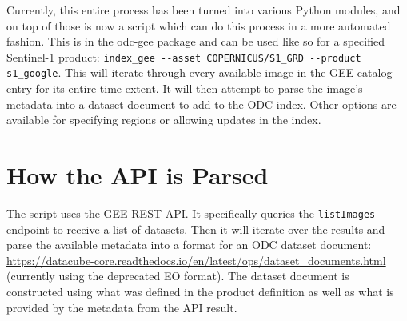 \documentclass{article}
\begin{document}
Currently, this entire process has been turned into various Python modules, and
on top of those is now a script which can do this process in a more automated
fashion. This is in the odc-gee package and can be used like so for a specified
Sentinel-1 product:
\lstinline{index_gee --asset COPERNICUS/S1_GRD --product s1_google}. This will
iterate through every available image in the GEE catalog entry for its entire
time extent. It will then attempt to parse the image's metadata into a dataset
document to add to the ODC index. Other options are available for specifying
regions or allowing updates in the index.

\section{How the API is Parsed}
The script uses the
\href{https://developers.google.com/earth-engine/reference}{GEE REST API}. It
specifically queries the
\href{https://developers.google.com/earth-engine/reference/rest/v1alpha/projects.assets/listImages}{\lstinline{listImages}
endpoint} to receive a list of datasets. Then it will iterate over the results
and parse the available metadata into a format for an ODC dataset document:
\url{https://datacube-core.readthedocs.io/en/latest/ops/dataset_documents.html}
(currently using the deprecated EO format). The dataset document is constructed
using what was defined in the product definition as well as what is provided by
the metadata from the API result.
\end{document}
